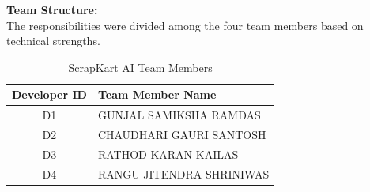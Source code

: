 \textbf{Team Structure:}\\
The responsibilities were divided among the four team members based on technical strengths.
\begin{table}[H]
\centering
\caption{ScrapKart AI Team Members}
\renewcommand{\arraystretch}{1.5}
\begin{tabular}{|c|l|}
\hline
\textbf{Developer ID} & \textbf{Team Member Name}\\
\hline
D1 & GUNJAL SAMIKSHA RAMDAS\\
D2 & CHAUDHARI GAURI SANTOSH\\
D3 & RATHOD KARAN KAILAS\\
D4 & RANGU JITENDRA SHRINIWAS\\
\hline
\end{tabular}
\end{table}
